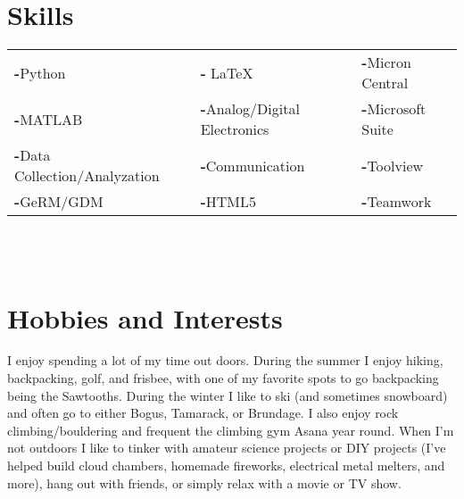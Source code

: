 \documentclass[a4paper,12pt]{article}
\begin{document}
\section{Skills}
    \begin{tabular}{|p{}|p{}|p{}}
         \textbf{-}Python & \textbf{-} \LaTeX & \textbf{-}Micron Central \\
         \textbf{-}MATLAB & \textbf{-}Analog/Digital Electronics & \textbf{-}Microsoft Suite \\
         \textbf{-}Data Collection/Analyzation & \textbf{-}Communication & \textbf{-}Toolview \\
         \textbf{-}GeRM/GDM & \textbf{-}HTML5 & \textbf{-}Teamwork \\
    \end{tabular}
\\
\\
\section{Hobbies and Interests}
I enjoy spending a lot of my time out doors. During the summer I enjoy hiking, backpacking, golf, and frisbee, 
with one of my favorite spots to go backpacking being the Sawtooths. During the winter I like to ski 
(and sometimes snowboard) and often go to either Bogus, Tamarack, or Brundage. I also enjoy rock climbing/bouldering 
and frequent the climbing gym Asana year round. When I'm not outdoors I like to tinker with amateur science projects 
or DIY projects (I've helped build cloud chambers, homemade fireworks, electrical metal melters, and more), hang out 
with friends, or simply relax with a movie or TV show. 
\end{document}
